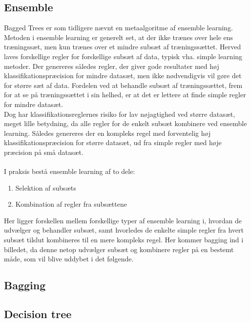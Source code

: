\subsection{Ensemble}
Bagged Trees er som tidligere nævnt en metaalgoritme af ensemble learning. Metoden i ensemble learning er generelt set, at der ikke trænes over hele ens træningssæt, men kun trænes over et mindre subsæt af træningssættet. Herved laves forskellige regler for forskellige subsæt af data, typisk vha. simple learning metoder. Der genereres således regler, der giver gode resultater med høj klassifikationspræcision for mindre datasæt, men ikke nødvendigvis vil gøre det for større sæt af data. 
Fordelen ved at behandle subsæt af træningssættet, frem for at se på træningssættet i sin helhed, er at det er lettere at finde simple regler for mindre datasæt.
\\Dog har klassifikationsreglernes risiko for lav nøjagtighed ved større datasæt, meget lille betydning, da alle regler for de enkelt subsæt kombinere ved ensemble learning. Således genereres der en kompleks regel med forventelig høj klassifikationspræcision for større datasæt, ud fra simple regler med høje præcision på små datasæt.
\\\\
I praksis bestå ensemble learning af to dele:
\begin{enumerate}
\item Selektion af subsæts
\item Kombination af regler fra subsættene
\end{enumerate}

Her ligger forskellen mellem forskellige typer af ensemble learning i, hvordan de udvælger og behandler subsæt, samt hvorledes de enkelte simple regler fra hvert subsæt tilslut kombineres til en mere kompleks regel. 
Her kommer bagging ind i billedet, da denne netop udvælger subsæt og kombinere regler på en bestemt måde, som vil blive uddybet i det følgende.

\subsection{Bagging}



\subsection{Decision tree}
